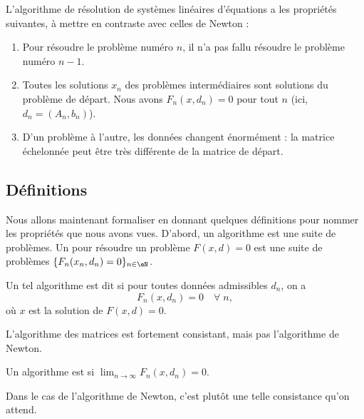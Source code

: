 L'algorithme de résolution de systèmes linéaires d'équations a les propriétés suivantes, à mettre en contraste avec celles de Newton :
\begin{enumerate}

	\item
	      Pour résoudre le problème numéro \( n\), il n'a pas fallu résoudre le problème numéro \( n-1\).
	\item
	      Toutes les solutions \( x_n\) des problèmes intermédiaires sont solutions du problème de départ. Nous avons \( F_n(x,d_n)=0\) pour tout \( n\) (ici, \( d_n=(A_n,b_n)\)).
	\item
	      D'un problème à l'autre, les données changent énormément : la matrice échelonnée peut être très différente de la matrice de départ.

\end{enumerate}

\subsection{Définitions}

Nous allons maintenant formaliser en donnant quelques définitions pour nommer les propriétés que nous avons vues. D'abord, un algorithme est une suite de problèmes. Un  pour résoudre un problème \( F(x,d)=0\) est une suite de problèmes \( \{F_n(x_n,d_n)=0\}_{n\in\eN}\).

\begin{definition}
	Un tel algorithme est dit   si pour toutes données admissibles \( d_n\), on a
	\begin{equation}
		F_n(x,d_n)=0\quad\forall \;n,
	\end{equation}
	où \( x\) est la solution de \( F(x,d)=0\).
\end{definition}
L'algorithme des matrices est fortement consistant, mais pas l'algorithme de Newton.

\begin{definition}
	Un algorithme est  si \( \lim_{n\to\infty}F_n(x,d_n)=0\).
\end{definition}
Dans le cas de l'algorithme de Newton, c'est plutôt une telle consistance qu'on attend.

